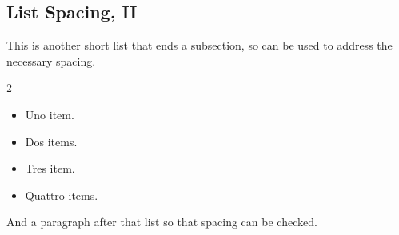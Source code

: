 \documentclass{amsart}
\theoremstyle{plain}%
\theoremstyle{definition}%
\theoremstyle{remark}%
\numberwithin{equation}{section}
\begin{document}
\subsection{List Spacing, II}\label{section-lists-4}%
This is another short list that ends a subsection, so can be used to address the necessary spacing.%
\begin{multicols}{2}
\begin{itemize}[label=\textbullet]
\item{}Uno item.%
\item{}Dos items.%
\item{}Tres item.%
\item{}Quattro items.%
\end{itemize}
\end{multicols}
%
\par
And a paragraph after that list so that spacing can be checked.%
%
%
\typeout{************************************************}
\typeout{************************************************}
%
\end{document}
